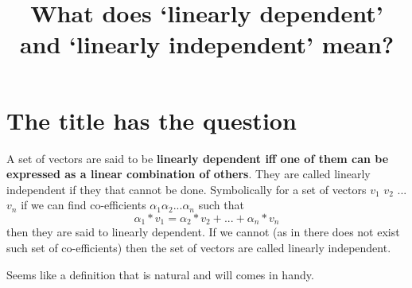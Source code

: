 \documentclass[12pt]{article}
\title{What does `linearly dependent' and `linearly independent' mean?}
\author{}
\begin{document}
\maketitle

\section{The title has the question}
A set of vectors are said to be \textbf{linearly dependent iff one of them can be expressed as a linear combination of others}. They are called linearly independent if they that cannot be done. Symbolically for a set of vectors $ v_1 $ $ v_2 $ ... $ v_n $ if we can find co-efficients $ \alpha_1 \alpha_2 ... \alpha_n $ such that \[ \alpha_1 * v_1  = \alpha_2 * v_2 + ... + \alpha_n * v_n \] then they are said to linearly dependent. If we cannot (as in there does not exist such set of co-efficients) then the set of vectors are called linearly independent.

Seems like a definition that is natural and will comes in handy.
\end{document}
